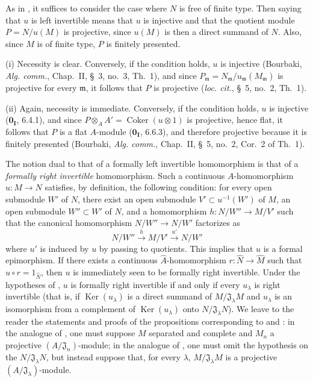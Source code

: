 As in , it suffices to consider the case where $N$ is free of finite type.
Then saying that $u$ is left invertible means that $u$ is injective and that the quotient module $P=N/u(M)$ is projective, since $u(M)$ is then a direct summand of $N$.
Also, since $M$ is of finite type, $P$ is finitely presented.

(i) Necessity is clear.
Conversely, if the condition holds, $u$ is injective (Bourbaki, \emph{Alg. comm.}, Chap.~II, \S~3, no.~3, Th.~1), and since
$P_{\mathfrak m}=N_{\mathfrak m}/u_{\mathfrak m}(M_{\mathfrak m})$ is projective for every $\mathfrak m$, it follows that $P$ is projective (\emph{loc. cit.}, \S~5, no.~2, Th.~1).

(ii) Again, necessity is immediate.
Conversely, if the condition holds, $u$ is injective ($\mathbf{0_I}$, 6.4.1), and since
$P\otimes_AA'=\operatorname{Coker}(u\otimes1)$ is projective, hence flat, it follows that $P$ is a flat $A$-module ($\mathbf{0_I}$, 6.6.3), and therefore projective because it is finitely presented (Bourbaki, \emph{Alg. comm.}, Chap.~II, \S~5, no.~2, Cor.~2 of Th.~1).


\begin{remark}[19.1.15]
\label{0.19.1.15}
The notion dual to that of a formally left invertible homomorphism is that of a \emph{formally right invertible} homomorphism.
Such a continuous $A$-homomorphism $u:M\to N$ satisfies, by definition, the following condition:
for every open submodule $W'$ of $N$, there exist an open submodule $V'\subset u^{-1}(W')$ of $M$, an open submodule $W''\subset W'$ of $N$, and a homomorphism $h:N/W''\to M/V'$ such that the canonical homomorphism $N/W''\to N/W'$ factorizes as
\[
  N/W''\xrightarrow{h}M/V'\xrightarrow{u'}N/W'
\]
where $u'$ is induced by $u$ by passing to quotients.
This implies that $u$ is a formal epimorphism.
If there exists a continuous $\widehat A$-homomorphism $r:\widehat N\to\widehat M$ such that $\widehat u\circ r=1_{\widehat N}$, then $u$ is immediately seen to be formally right invertible.
Under the hypotheses of , $u$ is formally right invertible if and only if every $u_\lambda$ is right invertible (that is, if $\operatorname{Ker}(u_\lambda)$ is a direct summand of $M/\mathfrak J_\lambda M$ and $u_\lambda$ is an isomorphism from a complement of $\operatorname{Ker}(u_\lambda)$ onto $N/\mathfrak J_\lambda N$).
We leave to the reader the statements and proofs of the propositions corresponding to  and :
in the analogue of , one must suppose $M$ separated and complete and $M_n$ a projective $(A/\mathfrak J_n)$-module;
in the analogue of , one must omit the hypothesis on the $N/\mathfrak J_\lambda N$, but instead suppose that, for every $\lambda$, $M/\mathfrak J_\lambda M$ is a projective $(A/\mathfrak J_\lambda)$-module.
\end{remark}

